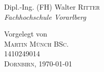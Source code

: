 \begin{titlepage}
\begin{center}
\begin{minipage}{0.7\textwidth}
\begin{center} \large

Dipl.-Ing. (FH) Walter \textsc{Ritter} \\ %
\emph{Fachhochschule Vorarlberg}

\end{center}
\end{minipage}
\hfill

\vspace*{\fill}

Vorgelegt von\\ [0.4cm]
\textsc{\Large Martin Münch BSc.}\\
1410249014 \\[2cm]

\textsc{ \large Dornbirn, \today}
\vfill %

\end{center}

\end{titlepage}

